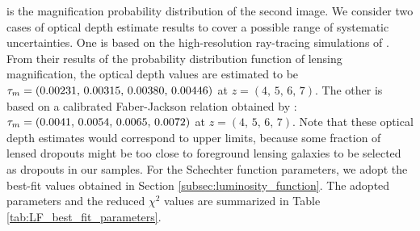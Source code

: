 \documentclass[]{pasj01}
\begin{document}
is the magnification probability distribution of the second image. 
%
We consider two cases of optical depth estimate results 
to cover a possible range of systematic uncertainties. 
One is based on the high-resolution ray-tracing simulations of \citet{2011ApJ...742...15T}. 
From their results of the probability distribution function of lensing magnification,  
the optical depth values are estimated to be 
$\tau_{\rm m} = (0.00231, \, 0.00315, \, 0.00380, \, 0.00446)$ 
at $z=(4, \, 5, \, 6, \, 7)$. 
The other is based on a calibrated Faber-Jackson relation \citep{1976ApJ...204..668F}  
obtained by \citet{2015MNRAS.450.1224B}: 
$\tau_{\rm m} = (0.0041, \, 0.0054, \, 0.0065, \, 0.0072)$ 
at $z=(4, \, 5, \, 6, \, 7)$. 
%
Note that these optical depth estimates would correspond to upper limits, 
because 
some fraction of lensed dropouts might be too close to foreground lensing galaxies 
to be selected as dropouts in our samples. 
%
For the Schechter function parameters, 
we adopt the best-fit values obtained in Section \ref{subsec:luminosity_function}.  
The adopted parameters and the reduced $\chi^2$ values are 
summarized in Table \ref{tab:LF_best_fit_parameters}. 
\end{document}
